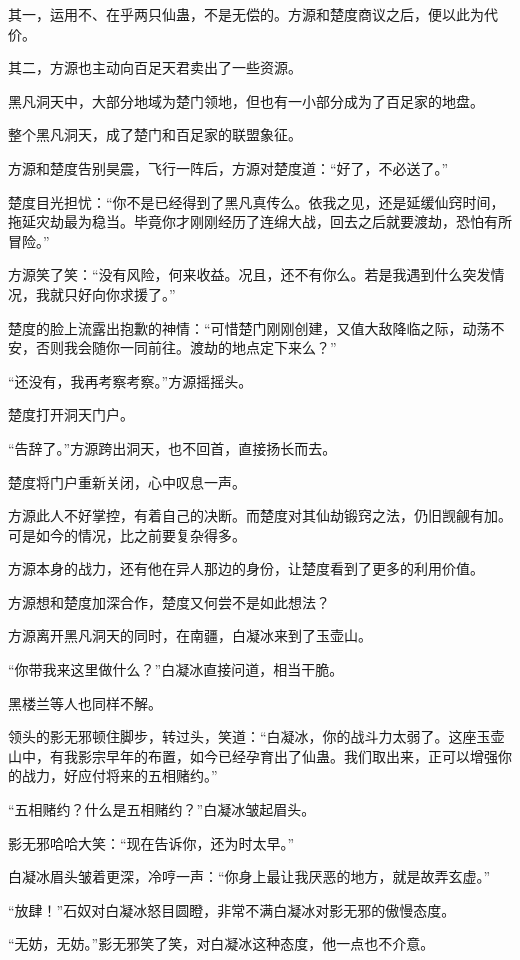 \begin{this_body}
其一，运用不、在乎两只仙蛊，不是无偿的。方源和楚度商议之后，便以此为代价。

其二，方源也主动向百足天君卖出了一些资源。

黑凡洞天中，大部分地域为楚门领地，但也有一小部分成为了百足家的地盘。

整个黑凡洞天，成了楚门和百足家的联盟象征。

方源和楚度告别昊震，飞行一阵后，方源对楚度道：“好了，不必送了。”

楚度目光担忧：“你不是已经得到了黑凡真传么。依我之见，还是延缓仙窍时间，拖延灾劫最为稳当。毕竟你才刚刚经历了连绵大战，回去之后就要渡劫，恐怕有所冒险。”

方源笑了笑：“没有风险，何来收益。况且，还不有你么。若是我遇到什么突发情况，我就只好向你求援了。”

楚度的脸上流露出抱歉的神情：“可惜楚门刚刚创建，又值大敌降临之际，动荡不安，否则我会随你一同前往。渡劫的地点定下来么？”

“还没有，我再考察考察。”方源摇摇头。

楚度打开洞天门户。

“告辞了。”方源跨出洞天，也不回首，直接扬长而去。

楚度将门户重新关闭，心中叹息一声。

方源此人不好掌控，有着自己的决断。而楚度对其仙劫锻窍之法，仍旧觊觎有加。可是如今的情况，比之前要复杂得多。

方源本身的战力，还有他在异人那边的身份，让楚度看到了更多的利用价值。

方源想和楚度加深合作，楚度又何尝不是如此想法？

方源离开黑凡洞天的同时，在南疆，白凝冰来到了玉壶山。

“你带我来这里做什么？”白凝冰直接问道，相当干脆。

黑楼兰等人也同样不解。

领头的影无邪顿住脚步，转过头，笑道：“白凝冰，你的战斗力太弱了。这座玉壶山中，有我影宗早年的布置，如今已经孕育出了仙蛊。我们取出来，正可以增强你的战力，好应付将来的五相赌约。”

“五相赌约？什么是五相赌约？”白凝冰皱起眉头。

影无邪哈哈大笑：“现在告诉你，还为时太早。”

白凝冰眉头皱着更深，冷哼一声：“你身上最让我厌恶的地方，就是故弄玄虚。”

“放肆！”石奴对白凝冰怒目圆瞪，非常不满白凝冰对影无邪的傲慢态度。

“无妨，无妨。”影无邪笑了笑，对白凝冰这种态度，他一点也不介意。

\end{this_body}

